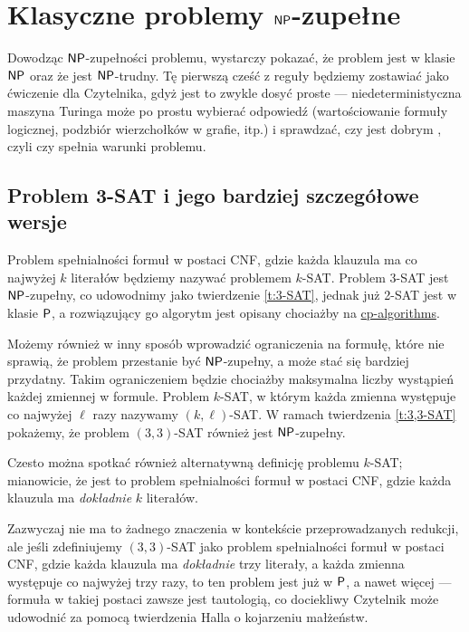 \section{Klasyczne problemy $\textsf{NP}$-zupełne}

Dowodząc $\textsf{NP}$-zupełności problemu, wystarczy pokazać, że problem jest w klasie $\textsf{NP}$ oraz że jest $\textsf{NP}$-trudny. Tę pierwszą cześć z reguły będziemy zostawiać jako ćwiczenie dla Czytelnika, gdyż jest to zwykle dosyć proste --- niedeterministyczna maszyna Turinga może po prostu wybierać odpowiedź (wartościowanie formuły logicznej, podzbiór wierzchołków w grafie, itp.) i sprawdzać, czy jest dobrym , czyli czy spełnia warunki problemu.

\subsection{Problem 3-SAT i jego bardziej szczegółowe wersje}

Problem spełnialności formuł w postaci CNF, gdzie każda klauzula ma co najwyżej $k$ literałów będziemy nazywać problemem $k$-SAT. Problem 3-SAT jest $\textsf{NP}$-zupełny, co udowodnimy jako twierdzenie \ref{t:3-SAT}, jednak już 2-SAT jest w klasie $\textsf{P}$, a rozwiązujący go algorytm jest opisany chociażby na \href{https://cp-algorithms.com/graph/2SAT.html}{cp-algorithms}.

Możemy również w inny sposób wprowadzić ograniczenia na formułę, które nie sprawią, że problem przestanie być $\textsf{NP}$-zupełny, a może stać się bardziej przydatny.
Takim ograniczeniem będzie chociażby maksymalna liczby wystąpień każdej zmiennej w formule. Problem $k$-SAT, w którym każda zmienna występuje co najwyżej $\ell$ razy nazywamy $(k, \ell)$-SAT. W ramach twierdzenia \ref{t:3,3-SAT} pokażemy, że problem $(3, 3)$-SAT również jest $\textsf{NP}$-zupełny.

\begin{remark}
    Czesto można spotkać również alternatywną definicję problemu $k$-SAT; mianowicie, że jest to problem spełnialności formuł w postaci CNF, gdzie każda klauzula ma \emph{dokładnie} $k$ literałów.

    Zazwyczaj nie ma to żadnego znaczenia w kontekście przeprowadzanych redukcji, ale jeśli zdefiniujemy $(3, 3)$-SAT jako problem spełnialności formuł w postaci CNF, gdzie każda klauzula ma \emph{dokładnie} trzy literały, a każda zmienna występuje co najwyżej trzy razy, to ten problem jest już w $\textsf{P}$, a nawet więcej --- formuła w takiej postaci zawsze jest tautologią, co dociekliwy Czytelnik może udowodnić za pomocą twierdzenia Halla o kojarzeniu małżeństw.
\end{remark}

